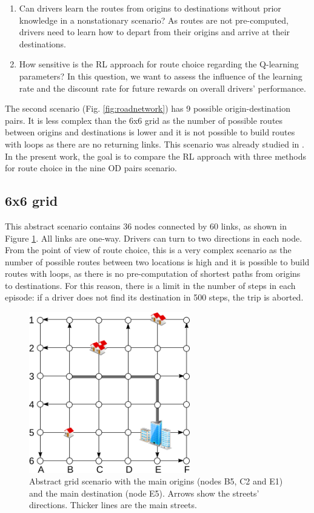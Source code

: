 \documentclass{RITA}
\begin{document}
\begin{enumerate}
  \item Can drivers learn the routes from origins to destinations without prior knowledge in a nonstationary scenario? As routes are not pre-computed, drivers need to learn how to depart from their origins and arrive at their destinations.
  \item How sensitive is the RL approach for route choice regarding the Q-learning parameters? In this question, we want to assess the influence of the learning rate and the discount rate for future rewards on overall drivers' performance.
\end{enumerate}

The second scenario (Fig. \ref{fig:roadnetwork}) has 9 possible origin-destination pairs. It is less complex than the 6x6 grid as the number of possible routes between origins and destinations is lower and it is not possible to build routes with loops as there are no returning links. This scenario was already studied in \cite{Tavares&Bazzan2012,Galib&Moser2011}. In the present work, the goal is to compare the RL approach with three methods for route choice in the nine OD pairs scenario.

\subsection{6x6 grid}

This abstract scenario contains 36 nodes connected by 60 links, as shown in Figure \ref{fig:6x6grid}. All links are one-way. Drivers can turn to two directions in each node. From the point of view of route choice, this is a very complex scenario as the number of possible routes between two locations is high and it is possible to build routes with loops, as there is no pre-computation of shortest paths from origins to destinations. For this reason, there is a limit in the number of steps in each episode: if a driver does not find its destination in 500 steps, the trip is aborted.

\begin{figure}[ht]
    \centerline{\includegraphics[width=7cm]{img/6x6grid.png}}
    \caption{Abstract grid scenario with the main origins (nodes B5, C2 and E1) and the main destination (node E5). Arrows show the streets' directions. Thicker lines are the main streets.}
    \label{fig:6x6grid}
\end{figure} 
\end{document}
